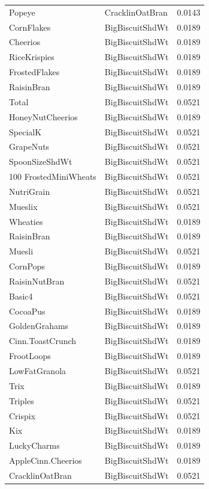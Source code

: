 \begin{longtable}{llr}
Popeye & CracklinOatBran & 0.0143 \\
CornFlakes & BigBiscuitShdWt & 0.0189 \\
Cheerios & BigBiscuitShdWt & 0.0189 \\
RiceKrispies & BigBiscuitShdWt & 0.0189 \\
FrostedFlakes & BigBiscuitShdWt & 0.0189 \\
RaisinBran & BigBiscuitShdWt & 0.0189 \\
Total & BigBiscuitShdWt & 0.0521 \\
HoneyNutCheerios & BigBiscuitShdWt & 0.0189 \\
SpecialK & BigBiscuitShdWt & 0.0521 \\
GrapeNuts & BigBiscuitShdWt & 0.0521 \\
SpoonSizeShdWt & BigBiscuitShdWt & 0.0521 \\
100%
FrostedMiniWheats & BigBiscuitShdWt & 0.0521 \\
NutriGrain & BigBiscuitShdWt & 0.0521 \\
Mueslix & BigBiscuitShdWt & 0.0521 \\
Wheaties & BigBiscuitShdWt & 0.0189 \\
RaisinBran & BigBiscuitShdWt & 0.0189 \\
Muesli & BigBiscuitShdWt & 0.0521 \\
CornPops & BigBiscuitShdWt & 0.0189 \\
RaisinNutBran & BigBiscuitShdWt & 0.0521 \\
Basic4 & BigBiscuitShdWt & 0.0521 \\
CocoaPus & BigBiscuitShdWt & 0.0189 \\
GoldenGrahams & BigBiscuitShdWt & 0.0189 \\
Cinn.ToastCrunch & BigBiscuitShdWt & 0.0189 \\
FrootLoops & BigBiscuitShdWt & 0.0189 \\
LowFatGranola & BigBiscuitShdWt & 0.0521 \\
Trix & BigBiscuitShdWt & 0.0189 \\
Triples & BigBiscuitShdWt & 0.0521 \\
Crispix & BigBiscuitShdWt & 0.0521 \\
Kix & BigBiscuitShdWt & 0.0189 \\
LuckyCharms & BigBiscuitShdWt & 0.0189 \\
AppleCinn.Cheerios & BigBiscuitShdWt & 0.0189 \\
CracklinOatBran & BigBiscuitShdWt & 0.0521 \\

\end{longtable}
